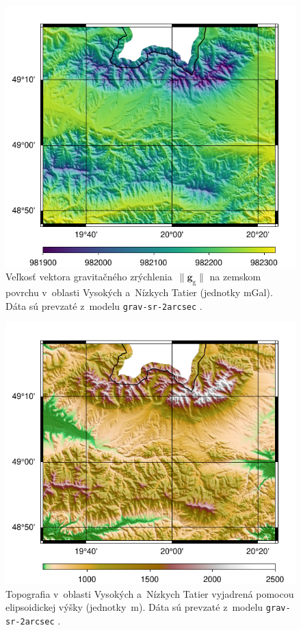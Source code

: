 \documentclass[a4paper,12pt]{book}
\newcommand{\gidx}{\mathrm g}
\let\vec\mathbf
\begin{document}
\begin{figure}
\centering
\includegraphics{./fig-gg-grav-sr-2arcsec.pdf}
\caption{Veľkosť vektora gravitačného zrýchlenia~$\| \vec g_\gidx \|$ na 
zemskom povrchu v~oblasti Vysokých a~Nízkych Tatier (jednotky mGal).  Dáta sú 
prevzaté z~modelu \texttt{grav-sr-2arcsec} \parencite{GravSR2arcsec}.}
\label{fig:gg_grav_sr_2arcsec}
\end{figure}

\begin{figure}
\centering
\includegraphics{./fig-h-grav-sr-2arcsec.pdf}
\caption{Topografia v~oblasti Vysokých a~Nízkych Tatier vyjadrená pomocou 
elipsoidickej výšky (jednotky~m).  Dáta sú prevzaté z~modelu 
\texttt{grav-sr-2arcsec} \parencite{GravSR2arcsec}.}
\label{fig:h_grav_sr_2arcsec}
\end{figure}
\end{document}
